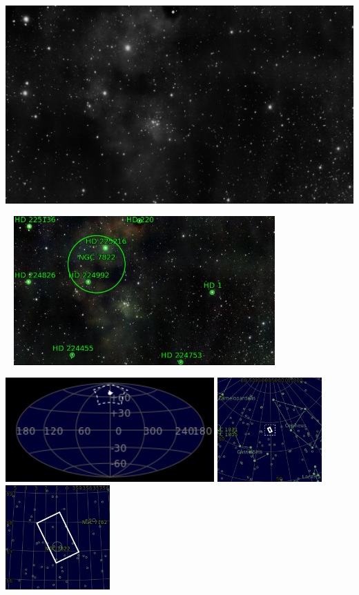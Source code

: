{\footnotesize\color{white}


}\ \\
\includegraphics[width=\textwidth]{../Imaging//Grayscale/HD225526.jpg}
\begin{center}
 \ \newpage
\includegraphics[width=0.75\textwidth]{../Imaging//Annotated/HD225526_Annotated.jpg}

\includegraphics[height=4cm]{../Imaging//Annotated/HD225526_Globe.jpg}
\includegraphics[height=4cm]{../Imaging//Annotated/HD225526_Close.jpg}
\includegraphics[height=4cm]{../Imaging//Annotated/HD225526_Closer.jpg}
\end{center}
